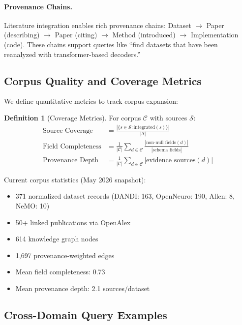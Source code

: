 \documentclass{article}
\theoremstyle{definition}
\newtheorem{definition}{Definition}[section]
\begin{document}
\paragraph{Provenance Chains.} Literature integration enables rich provenance chains: Dataset $\rightarrow$ Paper (describing) $\rightarrow$ Paper (citing) $\rightarrow$ Method (introduced) $\rightarrow$ Implementation (code). These chains support queries like ``find datasets that have been reanalyzed with transformer-based decoders.''

\subsection{Corpus Quality and Coverage Metrics}

We define quantitative metrics to track corpus expansion:

\begin{definition}[Coverage Metrics]
For corpus $\mathcal{C}$ with sources $\mathcal{S}$:
\begin{align}
\text{Source Coverage} &= \frac{|\{s \in \mathcal{S} : \text{integrated}(s)\}|}{|\mathcal{S}|} \\
\text{Field Completeness} &= \frac{1}{|\mathcal{C}|} \sum_{d \in \mathcal{C}} \frac{|\text{non-null fields}(d)|}{|\text{schema fields}|} \\
\text{Provenance Depth} &= \frac{1}{|\mathcal{C}|} \sum_{d \in \mathcal{C}} |\text{evidence sources}(d)|
\end{align}
\end{definition}

Current corpus statistics (May 2026 snapshot):
\begin{itemize}
    \item 371 normalized dataset records (DANDI: 163, OpenNeuro: 190, Allen: 8, NeMO: 10)
    \item 50+ linked publications via OpenAlex
    \item 614 knowledge graph nodes
    \item 1,697 provenance-weighted edges
    \item Mean field completeness: 0.73
    \item Mean provenance depth: 2.1 sources/dataset
\end{itemize}

\subsection{Cross-Domain Query Examples}
\end{document}
